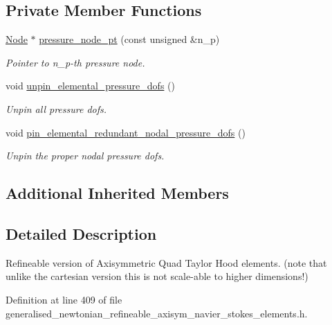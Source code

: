 \subsection*{Private Member Functions}
\begin{DoxyCompactItemize}
\item 
\hyperlink{classoomph_1_1Node}{Node} $\ast$ \hyperlink{classoomph_1_1RefineableGeneralisedNewtonianAxisymmetricQTaylorHoodElement_a323d05f3e4ba28e9e9b503f44cb33eb7}{pressure\+\_\+node\+\_\+pt} (const unsigned \&n\+\_\+p)
\begin{DoxyCompactList}\small\item\em Pointer to n\+\_\+p-\/th pressure node. \end{DoxyCompactList}\item 
void \hyperlink{classoomph_1_1RefineableGeneralisedNewtonianAxisymmetricQTaylorHoodElement_ad454d2660371f7a2b3bcbd7a951762b5}{unpin\+\_\+elemental\+\_\+pressure\+\_\+dofs} ()
\begin{DoxyCompactList}\small\item\em Unpin all pressure dofs. \end{DoxyCompactList}\item 
void \hyperlink{classoomph_1_1RefineableGeneralisedNewtonianAxisymmetricQTaylorHoodElement_a15c0c8547d963fd747929c973277ce74}{pin\+\_\+elemental\+\_\+redundant\+\_\+nodal\+\_\+pressure\+\_\+dofs} ()
\begin{DoxyCompactList}\small\item\em Unpin the proper nodal pressure dofs. \end{DoxyCompactList}\end{DoxyCompactItemize}
\subsection*{Additional Inherited Members}


\subsection{Detailed Description}
Refineable version of Axisymmetric Quad Taylor Hood elements. (note that unlike the cartesian version this is not scale-\/able to higher dimensions!) 

Definition at line 409 of file generalised\+\_\+newtonian\+\_\+refineable\+\_\+axisym\+\_\+navier\+\_\+stokes\+\_\+elements.\+h.



